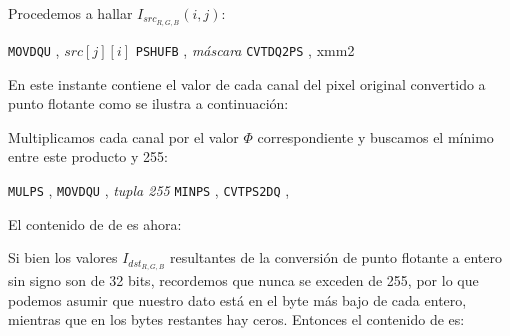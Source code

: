 Procedemos a hallar $I_{src_{R,G,B}}(i, j)$:

\begin{pseudocodigo}
    \STATE \texttt{MOVDQU} ,   $src[j][i]$      
    \STATE \texttt{PSHUFB} ,   \textit{máscara} 
    \STATE \texttt{CVTDQ2PS} , xmm{2}           
\end{pseudocodigo}

En este instante  contiene el valor de cada canal del pixel original
convertido a punto flotante como se ilustra a continuación:

\begin{center}
\end{center}

Multiplicamos cada canal por el valor $\Phi$ correspondiente y buscamos
el mínimo entre este producto y 255:

\begin{pseudocodigo}
    \STATE \texttt{MULPS}    ,  
    \STATE \texttt{MOVDQU}   , \textit{tupla 255}
    \STATE \texttt{MINPS}    , 
    \STATE \texttt{CVTPS2DQ} ,  
\end{pseudocodigo}

El contenido de de  es ahora:

\begin{center}
\end{center}

Si bien los valores $I_{dst_{R,G,B}}$ resultantes de la conversión de punto flotante a
entero sin signo son de 32 bits, recordemos que nunca se exceden de 255, por lo que podemos
asumir que nuestro dato está en el byte más bajo de cada entero, mientras que en los bytes
restantes hay ceros. Entonces el contenido de  es:

